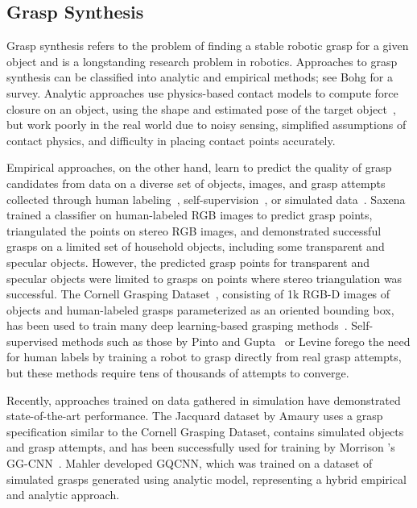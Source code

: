 \subsection{Grasp Synthesis}

Grasp synthesis refers to the problem of finding a stable robotic grasp for a given object and is a longstanding research problem in robotics. 
Approaches to grasp synthesis can be classified into analytic and empirical methods; see Bohg \etal\cite{bohg2013data} for a survey.
Analytic approaches use physics-based contact models to compute force closure on an object, using the shape and estimated pose of the target object~\cite{miller2003automatic, ten2017grasp, watkins2018multi}, but work poorly in the real world due to noisy sensing, simplified assumptions of contact physics, and difficulty in placing contact points accurately.

Empirical approaches, on the other hand, learn to predict the quality of grasp candidates from data on a diverse set of objects, images, and grasp attempts collected through human labeling~\cite{saxena2008robotic, jiang2011efficient, doi:10.1177/0278364914549607, 7139361}, self-supervision~\cite{pinto2016supersizing, levine2018learning}, or simulated data~\cite{depierre2018jacquard, doi:10.1177/0278364919859066, gualtieri2016high, mahler2017dex, satish2019policy}. 
Saxena \etal\cite{saxena2008robotic} trained a classifier on human-labeled RGB images to predict grasp points, triangulated the points on stereo RGB images, and demonstrated successful grasps on a limited set of household objects, including some transparent and specular objects.
However, the predicted grasp points for transparent and specular objects were limited to grasps on points where stereo triangulation was successful. 
The Cornell Grasping Dataset~\cite{jiang2011efficient}, consisting of 1k RGB-D images of objects and human-labeled grasps parameterized as an oriented bounding box, has been used to train many deep learning-based grasping methods~\cite{doi:10.1177/0278364914549607, doi:10.1177/0278364919859066, 7139361}. 
Self-supervised methods such as those by Pinto and Gupta~\cite{pinto2016supersizing} or Levine \etal\cite{levine2018learning} forego the need for human labels by training a robot to grasp directly from real grasp attempts, but these methods require tens of thousands of attempts to converge.

Recently, approaches trained on data gathered in simulation have demonstrated state-of-the-art performance.
The Jacquard dataset by Amaury \etal\cite{depierre2018jacquard} uses a grasp specification similar to the Cornell Grasping Dataset, contains simulated objects and grasp attempts, and has been successfully used for training by Morrison \etal's GG-CNN~\cite{doi:10.1177/0278364919859066}. 
Mahler \etal\cite{mahler2017dex} developed GQCNN, which was trained on a dataset of simulated grasps generated using analytic model, representing a hybrid empirical and analytic approach.  

